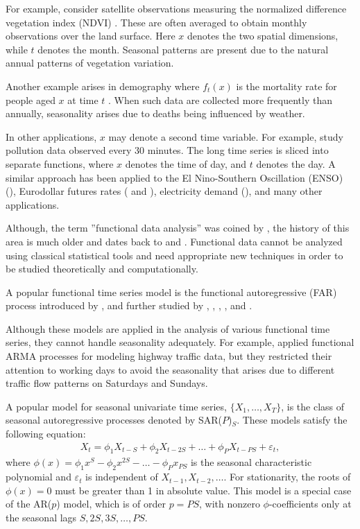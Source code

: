 \documentclass[11pt,a4paper]{article}
\numberwithin{equation}{section}
\begin{document}
For example, consider satellite observations measuring the normalized difference vegetation index (NDVI) \citep{he2018statistical}. These are often averaged to obtain monthly observations over the land surface. Here $x$ denotes the two spatial dimensions, while $t$ denotes the month. Seasonal patterns are present due to the natural annual patterns of vegetation variation.

Another example arises in demography where $f_t(x)$ is the mortality rate for people aged $x$ at time $t$ \citep{HU07}. When such data are collected more frequently than annually, seasonality arises due to deaths being influenced by weather.

In other applications, $x$ may denote a second time variable. For example, \citet{hormann2018testing} study pollution data observed every 30 minutes. The long time series is sliced into separate functions, where $x$ denotes the time of day, and $t$ denotes the day. A similar approach has been applied to the
 El Nino-Southern Oscillation (ENSO) (\citet{besse2000autoregressive}), Eurodollar futures rates (\citet{Kargin2008} and \citet{horvath2013estimation}), electricity demand (\citet{shang2013functional}), and many other applications.

Although, the term ''functional data analysis'' was coined by \citet{ramsay1982data}, the history of this area is much older and dates back to \citet{grenander1950stochastic} and \citet{rao1958some}. Functional data cannot be analyzed using classical statistical tools and need appropriate new techniques in order to be studied theoretically and computationally.

A popular functional time series model is the functional autoregressive (FAR) process introduced by \citet{Bosq2000}, and further studied by \citet{hormann2010weakly}, \citet{horvath2010testing}, \citet{horvath2012inference}, \citet{berkes2013weak}, \citet{hormann2013functional} and \citet{aue2015prediction}.

Although these models are applied in the analysis of various functional time series, they cannot handle seasonality adequately. For example, \citet{klepsch2017prediction} applied functional ARMA processes for modeling highway traffic data, but they restricted their attention to working days to avoid the seasonality that arises due to different traffic flow patterns on Saturdays and Sundays.

A popular model for seasonal univariate time series, $\{X_1,\dots,X_T\}$, is the class of seasonal autoregressive processes denoted by SAR($P$)$_S$. These models satisfy the following equation:
\begin{eqnarray*}
	X_t=\phi_1X_{t-S}+\phi_2X_{t-2S}+\dots+\phi_PX_{t-PS}+\varepsilon_t,
\end{eqnarray*}
where $\phi(x) = \phi_1x^{S}-\phi_2x^{2S}-\dots-\phi_Px_{PS}$ is the seasonal characteristic polynomial and $\varepsilon_t$ is independent of $X_{t-1}, X_{t-2}, \dots$. For stationarity, the roots of $\phi(x)=0$ must be greater than 1 in absolute value. This model is a special case of the AR($p$) model, which is of order $p = PS$, with nonzero $\phi$-coefficients only at the
seasonal lags $S, 2S, 3S,\dots, PS$.
\end{document}
